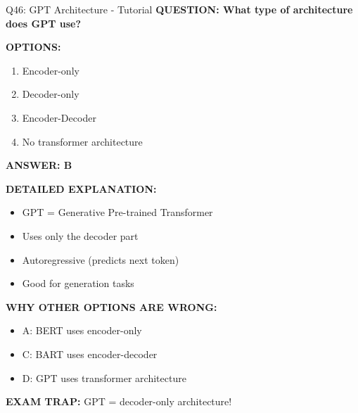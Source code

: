 \documentclass[8pt]{beamer}
\begin{document}
	\begin{frame}{Q46: GPT Architecture - Tutorial}
		\fontsize{6.5}{7.5}\selectfont
		\textbf{QUESTION: What type of architecture does GPT use?}
		
		\vspace{0.1cm}
		\textbf{OPTIONS:}
		\begin{enumerate}
			\item Encoder-only
			\item Decoder-only
			\item Encoder-Decoder
			\item No transformer architecture
		\end{enumerate}
		
		\vspace{0.1cm}
		\textcolor{myblue}{\textbf{ANSWER: B}}
		
		\vspace{0.1cm}
		\textbf{DETAILED EXPLANATION:}
		\begin{itemize}
			\item GPT = Generative Pre-trained Transformer
			\item Uses only the decoder part
			\item Autoregressive (predicts next token)
			\item Good for generation tasks
		\end{itemize}
		
		\vspace{0.1cm}
		\textcolor{myred}{\textbf{WHY OTHER OPTIONS ARE WRONG:}}
		\begin{itemize}
			\item \textcolor{myred}{A:} BERT uses encoder-only
			\item \textcolor{myred}{C:} BART uses encoder-decoder
			\item \textcolor{myred}{D:} GPT uses transformer architecture
		\end{itemize}
		
		\textcolor{myred}{\textbf{EXAM TRAP:}} GPT = \textcolor{myblue}{decoder-only} architecture!
	\end{frame}
	
\end{document}
